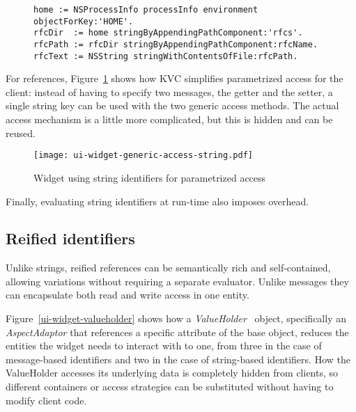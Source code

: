 \documentclass[preprint,authoryear]{llncs}
\begin{document}
\begin{figure}[htbp]
\begin{lstlisting}[style=numbers,label=rfcs-directory,caption=Accessing a specific RFC in a directory relative to the user's \$HOME.]
home := NSProcessInfo processInfo environment objectForKey:'HOME'.
rfcDir  := home stringByAppendingPathComponent:'rfcs'.
rfcPath := rfcDir stringByAppendingPathComponent:rfcName.
rfcText := NSString stringWithContentsOfFile:rfcPath.
\end{lstlisting}
\end{figure}


For references, Figure~\ref{ui-widget-string-access} shows how KVC simplifies parametrized access for 
the client:  instead of having to specify two messages, the getter and the setter, a single string key can be used with
the two generic access methods.  The actual access mechanism is a little more complicated, but this is hidden and can 
be reused.

\begin{figure}[htbp]
\centering
\texttt{[image: ui-widget-generic-access-string.pdf]}
\caption{Widget using string identifiers for parametrized access}
\label{ui-widget-string-access}

\end{figure}

Finally, evaluating string identifiers at run-time also imposes overhead.

\subsection{Reified identifiers}


Unlike strings, reified references can be semantically rich and self-contained, 
allowing variations without requiring a separate evaluator.
Unlike messages they can encapsulate both read and write access in one entity.  



Figure~\ref{ui-widget-valueholder} shows how a \emph{ValueHolder}~\cite{Woolf:1995:UUV:218662.218699} object,
specifically an {\em AspectAdaptor} that
references a specific attribute of the base object, reduces the entities the widget
needs to interact with to one, from three in the case of message-based identifiers and two
in the case of string-based identifiers.  How the ValueHolder accesses 
its underlying data is completely hidden from clients, so different containers or access
strategies can be substituted without having to modify client code.
\end{document}
